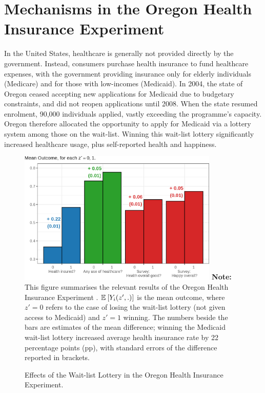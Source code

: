 \section{Mechanisms in the Oregon Health Insurance Experiment}
\label{sec:lottery}
In the United States, healthcare is generally not provided directly by the government.
Instead, consumers purchase health insurance to fund healthcare expenses, with the government providing insurance only for elderly individuals (Medicare) and for those with low-incomes (Medicaid).
In 2004, the state of Oregon ceased accepting new applications for Medicaid due to budgetary constraints, and did not reopen applications until 2008.
When the state resumed enrolment, 90,000 individuals applied, vastly exceeding the programme's capacity.
Oregon therefore allocated the opportunity to apply for Medicaid via a lottery system among those on the wait-list.
Winning this wait-list lottery significantly increased healthcare usage, plus self-reported health and happiness.

\begin{figure}[!htbp]
    \caption{Effects of the Wait-list Lottery in the Oregon Health Insurance Experiment.}
    \centering
    \includegraphics[width=0.85\textwidth]{sections/figures/insurance-effects.png}
    \label{fig:healthinsurance-effects}
    \justify
    \footnotesize    
    \textbf{Note:}
    This figure summarises the relevant results of the Oregon Health Insurance Experiment \citep{finkelstein2008oregon}.
    $\mathbb{E}_{} \left[ Y_i(z',.) \right]$ is the mean outcome, where $z' = 0$ refers to the case of losing the wait-list lottery (not given access to Medicaid) and $z' = 1$ winning.
    The numbers beside the bars are estimates of the mean difference; winning the Medicaid wait-list lottery increased average health insurance rate by 22 percentage points (pp), with standard errors of the difference reported in brackets.
\end{figure}

